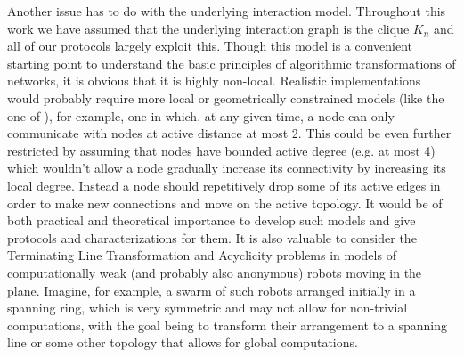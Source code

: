 \documentclass[preprint]{elsarticle}
\begin{document}
Another issue has to do with the underlying interaction model. Throughout this work we have assumed that the underlying interaction graph is the clique $K_n$ and all of our protocols largely exploit this. Though this model is a convenient starting point to understand the basic principles of algorithmic transformations of networks, it is obvious that it is highly non-local. Realistic implementations would probably require more local or geometrically constrained models (like the one of \cite{Mi15}), for example, one in which, at any given time, a node can only communicate with nodes at active distance at most 2. This could be even further restricted by assuming that nodes have bounded active degree (e.g. at most 4) which wouldn't allow a node gradually increase its connectivity by increasing its local degree. Instead a node should repetitively drop some of its active edges in order to make new connections and move on the active topology. It would be of both practical and theoretical importance to develop such models and give protocols and characterizations for them. It is also valuable to consider the Terminating Line Transformation and Acyclicity problems in models of computationally weak (and probably also anonymous) robots moving in the plane. Imagine, for example, a swarm of such robots arranged initially in a spanning ring, which is very symmetric and may not allow for non-trivial computations, with the goal being to transform their arrangement to a spanning line or some other topology that allows for global computations.
\end{document}
